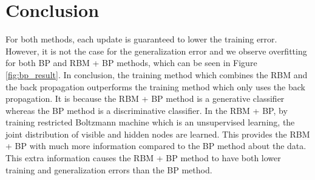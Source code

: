 \documentclass{article} %
\begin{document}
\section{Conclusion}
For both methods, each update is guaranteed to lower the training error. However, it is not the case for the generalization error and we observe overfitting for both BP and RBM + BP methods, which can be seen in  Figure \ref{fig:bp_result}. In conclusion, the training method which combines the RBM and the back propagation outperforms the training method which only uses the back propagation. It is because the RBM + BP method is a generative classifier whereas the BP method is a discriminative classifier. In the RBM + BP, by training restricted Boltzmann machine which is an unsupervised learning, the joint distribution of visible and hidden nodes are learned. This provides the RBM + BP with much more information compared to the BP method about the data. This extra information causes the RBM + BP method to have both lower training and generalization errors than the BP method.  

\nocite{*} %
\small{ %

}
\end{document}
